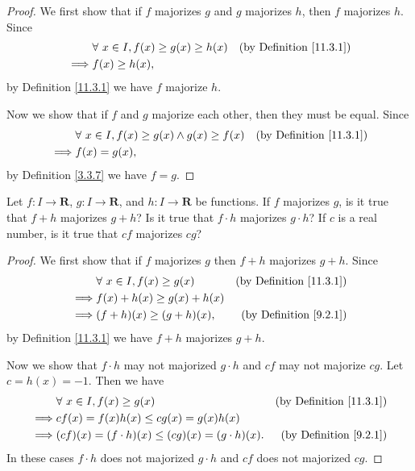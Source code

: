 \begin{proof}
    We first show that if \(f\) majorizes \(g\) and \(g\) majorizes \(h\), then \(f\) majorizes \(h\).
    Since
    \begin{align*}
                 & \forall\ x \in I, f(x) \geq g(x) \geq h(x) & \text{(by Definition \ref{11.3.1})} \\
        \implies & f(x) \geq h(x),
    \end{align*}
    by Definition \ref{11.3.1} we have \(f\) majorize \(h\).

    Now we show that if \(f\) and \(g\) majorize each other, then they must be equal.
    Since
    \begin{align*}
                 & \forall\ x \in I, f(x) \geq g(x) \land g(x) \geq f(x) & \text{(by Definition \ref{11.3.1})} \\
        \implies & f(x) = g(x),
    \end{align*}
    by Definition \ref{3.3.7} we have \(f = g\).
\end{proof}

\begin{exercise}\label{ex 11.3.2}
    Let \(f : I \to \mathbf{R}\), \(g : I \to \mathbf{R}\), and \(h : I \to \mathbf{R}\) be functions.
    If \(f\) majorizes \(g\), is it true that \(f + h\) majorizes \(g + h\)?
    Is it true that \(f \cdot h\) majorizes \(g \cdot h\)?
    If \(c\) is a real number, is it true that \(cf\) majorizes \(cg\)?
\end{exercise}

\begin{proof}
    We first show that if \(f\) majorizes \(g\) then \(f + h\) majorizes \(g + h\).
    Since
    \begin{align*}
                 & \forall\ x \in I, f(x) \geq g(x) & \text{(by Definition \ref{11.3.1})} \\
        \implies & f(x) + h(x) \geq g(x) + h(x)                                           \\
        \implies & (f + h)(x) \geq (g + h)(x),      & \text{(by Definition \ref{9.2.1})}
    \end{align*}
    by Definition \ref{11.3.1} we have \(f + h\) majorizes \(g + h\).

    Now we show that \(f \cdot h\) may not majorized \(g \cdot h\) and \(cf\) may not majorize \(cg\).
    Let \(c = h(x) = -1\).
    Then we have
    \begin{align*}
                 & \forall\ x \in I, f(x) \geq g(x)                        & \text{(by Definition \ref{11.3.1})} \\
        \implies & cf(x) = f(x) h(x) \leq cg(x) = g(x) h(x)                                                      \\
        \implies & (cf)(x) = (f \cdot h)(x) \leq (cg)(x) = (g \cdot h)(x). & \text{(by Definition \ref{9.2.1})}
    \end{align*}
    In these cases \(f \cdot h\) does not majorized \(g \cdot h\) and \(cf\) does not majorized \(cg\).
\end{proof}

